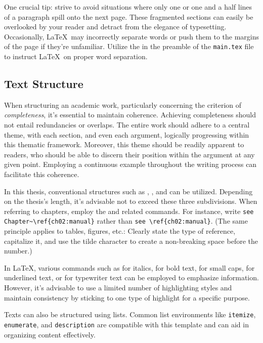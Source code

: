 \documentclass[
    language=english, %
    thesis=bachelor, %
    supervisor=postdoc, %
    multiauthor=false, %
    ]{settings/csssa-thesis}
\begin{document}
One crucial tip: strive to avoid situations where only one or one and a half lines of a paragraph spill onto the next page. These fragmented sections can easily be overlooked by your reader and detract from the elegance of typesetting. Occasionally, \LaTeX\ may incorrectly separate words or push them to the margins of the page if they're unfamiliar. Utilize the  in the preamble of the \texttt{main.tex} file to instruct \LaTeX\ on proper word separation.

\subsection{Text Structure}\label{ch02:sec1:structure}

When structuring an academic work, particularly concerning the criterion of \emph{completeness}, it's essential to maintain coherence. Achieving completeness should not entail redundancies or overlaps. The entire work should adhere to a central theme, with each section, and even each argument, logically progressing within this thematic framework. Moreover, this theme should be readily apparent to readers, who should be able to discern their position within the argument at any given point. Employing a continuous example throughout the writing process can facilitate this coherence.

In this thesis, conventional structures such as , , and  can be utilized. Depending on the thesis's length, it's advisable not to exceed these three subdivisions. When referring to chapters, employ the  and related  commands. For instance, write \verb|see Chapter~\ref{ch02:manual}| rather than \verb|see \ref{ch02:manual}|. (The same principle applies to tables, figures, etc.: Clearly state the type of reference, capitalize it, and use the tilde character to create a non-breaking space before the number.)

In \LaTeX, various commands such as  for italics,  for bold text,  for small caps,  for underlined text, or  for typewriter text can be employed to emphasize information. However, it's advisable to use a limited number of highlighting styles and maintain consistency by sticking to one type of highlight for a specific purpose.

Texts can also be structured using lists. Common list environments like \texttt{itemize}, \texttt{enumerate}, and \texttt{description} are compatible with this template and can aid in organizing content effectively.
\end{document}
